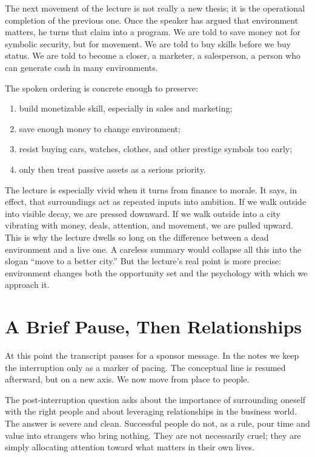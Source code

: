 The next movement of the lecture is not really a new thesis; it is the operational completion of the previous one. Once the speaker has argued that environment matters, he turns that claim into a program. We are told to save money not for symbolic security, but for movement. We are told to buy skills before we buy status. We are told to become a closer, a marketer, a salesperson, a person who can generate cash in many environments.

The spoken ordering is concrete enough to preserve:
\begin{enumerate}
\item build monetizable skill, especially in sales and marketing;
\item save enough money to change environment;
\item resist buying cars, watches, clothes, and other prestige symbols too early;
\item only then treat passive assets as a serious priority.
\end{enumerate}

The lecture is especially vivid when it turns from finance to morale. It says, in effect, that surroundings act as repeated inputs into ambition. If we walk outside into visible decay, we are pressed downward. If we walk outside into a city vibrating with money, deals, attention, and movement, we are pulled upward. This is why the lecture dwells so long on the difference between a dead environment and a live one. A careless summary would collapse all this into the slogan ``move to a better city.'' But the lecture's real point is more precise: environment changes both the opportunity set and the psychology with which we approach it.

\section{A Brief Pause, Then Relationships}

At this point the transcript pauses for a sponsor message. In the notes we keep the interruption only as a marker of pacing. The conceptual line is resumed afterward, but on a new axis. We now move from place to people.

The post-interruption question asks about the importance of surrounding oneself with the right people and about leveraging relationships in the business world. The answer is severe and clean. Successful people do not, as a rule, pour time and value into strangers who bring nothing. They are not necessarily cruel; they are simply allocating attention toward what matters in their own lives.

